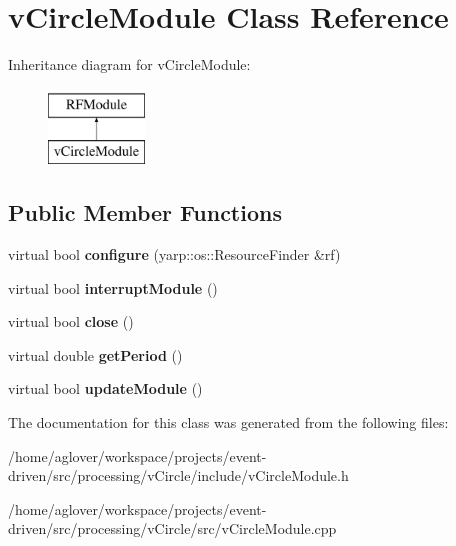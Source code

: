 \hypertarget{classvCircleModule}{}\section{v\+Circle\+Module Class Reference}
\label{classvCircleModule}
Inheritance diagram for v\+Circle\+Module\+:\begin{figure}[H]
\begin{center}
\leavevmode
\includegraphics[height=2.000000cm]{classvCircleModule}
\end{center}
\end{figure}
\subsection*{Public Member Functions}
\begin{DoxyCompactItemize}
\item 
virtual bool {\bfseries configure} (yarp\+::os\+::\+Resource\+Finder \&rf)\hypertarget{classvCircleModule_a4b1534c8acd2a20a874b1e3fb2f2bbbf}{}\label{classvCircleModule_a4b1534c8acd2a20a874b1e3fb2f2bbbf}

\item 
virtual bool {\bfseries interrupt\+Module} ()\hypertarget{classvCircleModule_aee48b945926e1ee1d53c03d2f8fdb462}{}\label{classvCircleModule_aee48b945926e1ee1d53c03d2f8fdb462}

\item 
virtual bool {\bfseries close} ()\hypertarget{classvCircleModule_a9c266baf21bf1a84e1d47bc82a6ebbaa}{}\label{classvCircleModule_a9c266baf21bf1a84e1d47bc82a6ebbaa}

\item 
virtual double {\bfseries get\+Period} ()\hypertarget{classvCircleModule_a87f95035935e336eef6b9890920c1bcb}{}\label{classvCircleModule_a87f95035935e336eef6b9890920c1bcb}

\item 
virtual bool {\bfseries update\+Module} ()\hypertarget{classvCircleModule_a0137387e1760f41bb422e10c702df2a0}{}\label{classvCircleModule_a0137387e1760f41bb422e10c702df2a0}

\end{DoxyCompactItemize}


The documentation for this class was generated from the following files\+:\begin{DoxyCompactItemize}
\item 
/home/aglover/workspace/projects/event-\/driven/src/processing/v\+Circle/include/v\+Circle\+Module.\+h\item 
/home/aglover/workspace/projects/event-\/driven/src/processing/v\+Circle/src/v\+Circle\+Module.\+cpp\end{DoxyCompactItemize}
